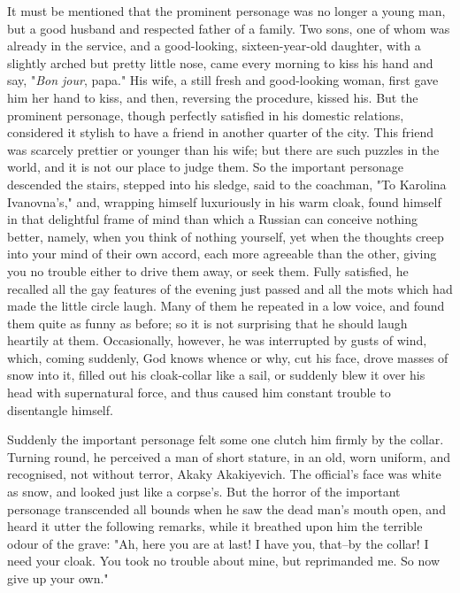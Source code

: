 It must be mentioned that the prominent personage was no longer a
young man, but a good husband and respected father of a family. Two
sons, one of whom was already in the service, and a good-looking,
sixteen-year-old daughter, with a slightly arched but pretty little
nose, came every morning to kiss his hand and say, "\emph{Bon jour}, papa."
His wife, a still fresh and good-looking woman, first gave him her
hand to kiss, and then, reversing the procedure, kissed his. But the
prominent personage, though perfectly satisfied in his domestic
relations, considered it stylish to have a friend in another quarter
of the city. This friend was scarcely prettier or younger than his
wife; but there are such puzzles in the world, and it is not our place
to judge them. So the important personage descended the stairs,
stepped into his sledge, said to the coachman, "To Karolina
Ivanovna's," and, wrapping himself luxuriously in his warm cloak,
found himself in that delightful frame of mind than which a Russian
can conceive nothing better, namely, when you think of nothing
yourself, yet when the thoughts creep into your mind of their own
accord, each more agreeable than the other, giving you no trouble
either to drive them away, or seek them. Fully satisfied, he recalled
all the gay features of the evening just passed and all the mots which
had made the little circle laugh. Many of them he repeated in a low
voice, and found them quite as funny as before; so it is not
surprising that he should laugh heartily at them. Occasionally,
however, he was interrupted by gusts of wind, which, coming suddenly,
God knows whence or why, cut his face, drove masses of snow into it,
filled out his cloak-collar like a sail, or suddenly blew it over his
head with supernatural force, and thus caused him constant trouble to
disentangle himself.

Suddenly the important personage felt some one clutch him firmly by
the collar. Turning round, he perceived a man of short stature, in an
old, worn uniform, and recognised, not without terror, Akaky
Akakiyevich. The official's face was white as snow, and looked just
like a corpse's. But the horror of the important personage transcended
all bounds when he saw the dead man's mouth open, and heard it utter
the following remarks, while it breathed upon him the terrible odour
of the grave: "Ah, here you are at last! I have you, that--by the
collar! I need your cloak. You took no trouble about mine, but
reprimanded me. So now give up your own."

